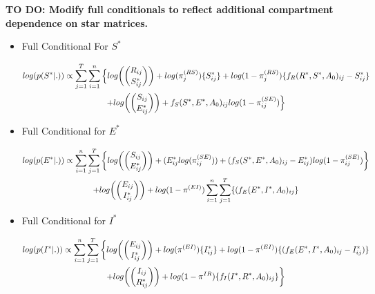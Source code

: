\documentclass[12pt]{article}
\begin{document}
{\bf{TO DO: Modify full conditionals to reflect additional compartment dependence on star matrices.}}

\begin{itemize}
    \item{Full Conditional For $S^*$}
    \begin{center}
        \begin{multline}
        \displaystyle
        log(p(S^*|.))\propto 
            \sum_{j=1}^T\sum_{i=1}^n\Big\{log\bigg(\dbinom{R_{ij}}{S^*_{ij}}\bigg) + log(\pi_j^{(RS)})\{S^*_{ij}\} + 
                log(1-\pi_j^{(RS)})\{f_R(R^*, S^*, A_0)_{ij} - S^*_{ij}\}\\ 
            + log\bigg(\dbinom{S_{ij}}{E^*_{ij}}\bigg) + f_S(S^*, E^*, A_0)_{ij}log(1-\pi_{ij}^{(SE)})\Big\}
        \end{multline}
    \end{center}

    \item{Full Conditional for $E^*$}
    \begin{center}
    \begin{multline}
        \displaystyle
        log(p(E^*|.))\propto \sum_{i=1}^n \sum_{j=1}^T\bigg\{log\bigg(\dbinom{S_{ij}}{E^*_{ij}}\bigg) + 
                (E^*_{ij}log(\pi_{ij}^{(SE)})) + (f_S(S^*, E^*, A_0)_{ij} - E^*_{ij})log(1-\pi_{ij}^{(SE)})\bigg\} \\
                + log\bigg(\dbinom{E_{ij}}{I^*_{ij}}\bigg) + log(1-\pi^{(EI)})\sum_{i=1}^n\sum_{j=1}^T\{(f_E(E^*, I^*, A_0)_{ij}\}\\
    \end{multline}
    \end{center}

    \item{Full Conditional for $I^*$}
    \begin{center}
    \begin{multline}
        \displaystyle
        log(p(I^*|.)) \propto \sum_{i=1}^n\sum_{j=1}^T\bigg\{ log\bigg(\dbinom{E_{ij}}{I^*_{ij}}\bigg) + log(\pi^{(EI)})\{I^*_{ij}\}          
            + log(1-\pi^{(EI)})\{(f_E(E^*, I^*, A_0)_{ij} - I^*_{ij})\}\\
            + log\bigg(\dbinom{I_{ij}}{R^*_{ij}}\bigg) + log(1-\pi^{IR})\{ f_I(I^*, R^*, A_0)_{ij}\}\bigg\}\\
    \end{multline}
    \end{center}


\end{itemize}
\end{document}
